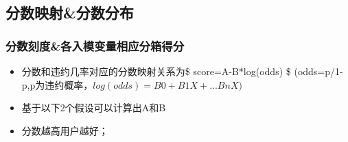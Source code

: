 \documentclass[11pt]{article}
\begin{document}
    \begin{center}
    \end{center}
    { \hspace*{\fill} \\}
    
    \begin{center}
    \end{center}
    { \hspace*{\fill} \\}
    
    \subsection{分数映射\&分数分布}\label{ux5206ux6570ux6620ux5c04ux5206ux6570ux5206ux5e03}

    \subsubsection{分数刻度\&各入模变量相应分箱得分}\label{ux5206ux6570ux523bux5ea6ux5404ux5165ux6a21ux53d8ux91cfux76f8ux5e94ux5206ux7bb1ux5f97ux5206}

\begin{itemize}
\item
  分数和违约几率对应的分数映射关系为\$ score=A-B*log(odds) \$
  (odds=p/1-p,p为违约概率，\(log(odds)=B0+B1X+...BnX)\)
\item
  基于以下2个假设可以计算出A和B
\item
  分数越高用户越好；
\end{itemize}
\end{document}
